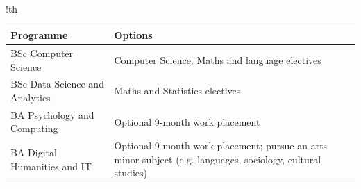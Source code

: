 \begin{tabbox}{!th}
\caption{Programme options}
\label{tab:programmeoptions}
\footnotesize   
\begin{tabular}{p{5cm} 
                p{9cm}
                }

\toprule 
Programme & Options \\
\midrule 
BSc Computer Science & Computer Science, Maths and language electives\\
\hdashline
BSc Data Science and Analytics & Maths and Statistics electives\\
\hdashline
BA Psychology and Computing & Optional 9-month work placement\\
\hdashline
BA Digital Humanities and IT & Optional 9-month work placement; pursue an arts minor subject (e.g. languages, sociology, cultural studies)\\
\bottomrule 
\end{tabular}


\end{tabbox}